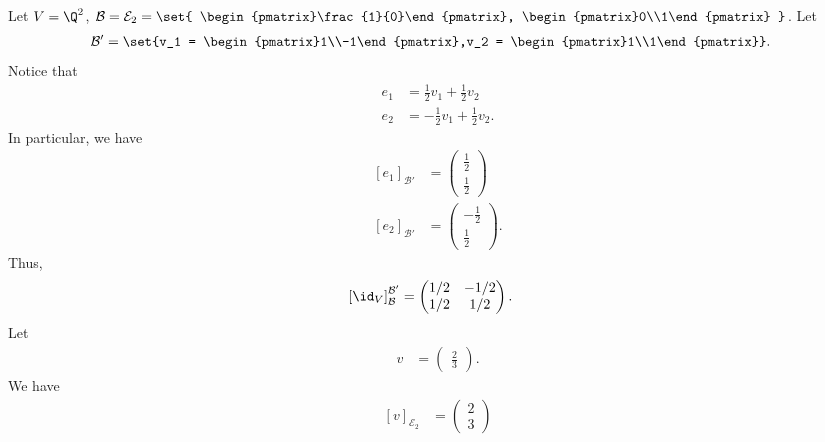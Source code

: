 \documentclass[10pt]{mypackage}
\begin{document}
\begin{example}
  Let $V = \Q^2$, $\mathcal{B} = \mathcal{E}_2 = \set{ \begin{pmatrix}\frac{1}{0}\end{pmatrix}, \begin{pmatrix}0\\1\end{pmatrix} }$. Let
  \begin{align*}
    \mathcal{B}' &= \set{v_1 = \begin{pmatrix}1\\-1\end{pmatrix},v_2 = \begin{pmatrix}1\\1\end{pmatrix}}.
  \end{align*}
  Notice that
  \begin{align*}
    e_1 &= \frac{1}{2}v_1 + \frac{1}{2}v_2\\
    e_2 &= -\frac{1}{2}v_1 + \frac{1}{2}v_2.
  \end{align*}
  In particular, we have
  \begin{align*}
    \left[e_1\right]_{\mathcal{B}'} &= \begin{pmatrix}\frac{1}{2}\\\frac{1}{2}\end{pmatrix}\\
    \left[e_2\right]_{\mathcal{B}'} &= \begin{pmatrix}-\frac{1}{2}\\\frac{1}{2}\end{pmatrix}.
  \end{align*}
  Thus,
  \begin{align*}
    \left[\id_{V}\right]_{\mathcal{B}}^{\mathcal{B}'} &= \begin{pmatrix}1/2 & -1/2 \\ 1/2 & 1/2\end{pmatrix}.
  \end{align*}
  Let
  \begin{align*}
    v &= \begin{pmatrix}\frac{2}{3}\end{pmatrix}.
  \end{align*}
  We have
  \begin{align*}
    \left[v\right]_{\mathcal{E}_2} &= \begin{pmatrix}2\\3\end{pmatrix}\\

\end{align*}
\end{example}
\end{document}
